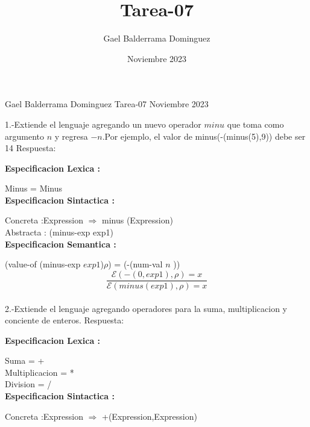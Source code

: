\documentclass{article}
\author{Gael Balderrama Dominguez}
\title{Tarea-07}
\date{Noviembre 2023}
\begin{document}
\begin{center}
    Gael Balderrama Dominguez \linebreak
    Tarea-07 \linebreak
    Noviembre 2023 \linebreak
\end{center}

1.-Extiende el lenguaje agregando un nuevo operador $minu$ que toma como argumento $n$ y regresa $-n$.Por ejemplo, el valor de minus(-(minus(5),9)) debe ser 14 \newline
Respuesta: \newline

\textbf{Especificacion Lexica :} \newline

Minus = Minus \\

\textbf{Especificacion Sintactica :} \newline

Concreta :Expression $\Rightarrow $ minus (Expression) \\

Abstracta : (minus-exp exp1)\\


\textbf{Especificacion Semantica :} \newline

(value-of (minus-exp $exp1$)$\rho$) = (-(num-val $n$ )) \\


$$\frac{\mathcal{E}(-(0, exp1),\rho)=x}{\mathcal{E}(minus(exp1),\rho ) = x}$$\\


2.-Extiende el lenguaje agregando operadores para la suma, multiplicacion y conciente de enteros. \newline
Respuesta: \newline

\textbf{Especificacion Lexica :} \newline

Suma = + \\

Multiplicacion = * \\

Division = / \\

\textbf{Especificacion Sintactica :} \newline

Concreta :Expression $\Rightarrow $ +(Expression,Expression) \\
\end{document}
